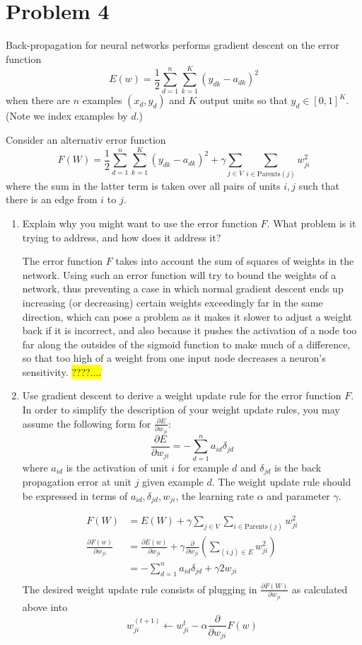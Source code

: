 \documentclass{article}
\newcommand{\edit}[1]{\colorbox{Yellow}{#1}}
\newcommand{\dee}[2]{\frac{\partial{#1}}{\partial{#2}}}
\begin{document}
  \section*{Problem 4}
  Back-propagation for neural networks performs gradient descent on the 
  error function
  $$E(w)=\frac{1}{2}\sum_{d=1}^n\sum_{k=1}^K(y_{dk}-a_{dk})^2$$
  when there are $n$ examples $(x_d,y_d)$ and $K$ output units
  so that $y_d\in [0,1]^K$. (Note we index examples by $d$.)

  Consider an alternativ error function
  $$F(W)=\frac{1}{2}\sum_{d=1}^n\sum_{k=1}^K (y_{dk}-a_{dk})^2+\gamma \sum_{j\in V}\sum_{i\in\text{Parents}(j)} w_{ji}^2$$
  where the sum in the latter term is taken over all pairs of units $i,j$
  such that there is an edge from $i$ to $j$. 

\begin{enumerate}
\item Explain why you might want to use the error function $F$. What
problem is it trying to address, and how does it address it?

The error function $F$ takes into account the sum of squares of weights
in the network. Using such an error function will try to bound the
weights of a network, thus preventing a case in which normal gradient
descent ends up increasing (or decreasing) certain weights exceedingly far
in the same direction, which can pose a problem as it makes it 
slower to adjust a weight back if it is incorrect, and also because it pushes
the activation of a node too far along the outsides of the sigmoid
function to make much of a difference, so that too high of a weight
from one input node decreases a neuron's sensitivity. 
\edit{????....}

\item Use gradient descent to derive a weight update rule for the
error function $F$. In order to simplify the description of your
weight update rules, you may assume the following form for $\frac{\partial E}{\partial w_{ji}}$:
$$\frac{\partial E}{\partial w_{ji}} = -\sum_{d=1}^n a_{id} \delta_{jd}$$
where $a_{id}$ is the activation of unit $i$ for example $d$ and 
$\delta_{jd}$ is the back propagation error at unit $j$ given example
$d$. The weight update rule should be expressed in terms of $a_{id},\delta_{jd},w_{ji}$,
the learning rate $\alpha$ and parameter $\gamma$. 

\begin{align*}
F(W) & = E(W)+\gamma\sum_{j\in V}\sum_{i\in \text{Parents}(j)} w_{ji}^2 \\
\dee{F(w)}{w_{ji}} & = \dee{E(w)}{w_{ji}} + \gamma \dee{}{w_{ji}} \left( \sum_{(i.j)\in E} w_{ji}^2\right) \\
 & = -\sum_{d=1}^n a_{id} \delta_{jd}+ \gamma 2w_{ji}\\
\end{align*}
The desired weight update rule consists of plugging in $\dee{F(W)}{w_{ji}}$ as calculated
above into 
$$w_{ji}^{(t+1)}\leftarrow w_{ji}^t-\alpha \dee{}{w_{ji}} F(w)$$
\end{enumerate}
\end{document}
